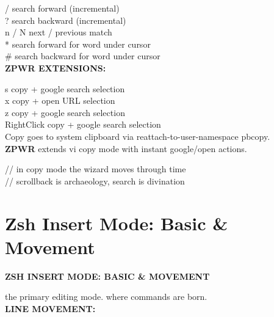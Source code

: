 \documentclass[11pt,a4paper,twoside]{book}
\begin{document}
/                     search forward (incremental)\\
?                     search backward (incremental)\\
n / N                next / previous match\\
*                     search forward for word under cursor\\
\#                     search backward for word under cursor\\


\vspace{12pt}
{\bfseries\color{neonyellow} \textbf{ZPWR} EXTENSIONS:}\vspace{4pt}

s                     copy + google search selection\\
x                     copy + open URL selection\\
z                     copy + google search selection\\
RightClick            copy + google search selection\\

Copy goes to system clipboard via reattach-to-user-namespace pbcopy.\\
\textbf{ZPWR} extends vi copy mode with instant google/open actions.\\

\begin{codebox}
\color{neongreen}// in copy mode the wizard moves through time\\
\color{neongreen}// scrollback is archaeology, search is divination\\
\end{codebox}


\vspace{16pt}

\section{Zsh Insert Mode: Basic \& Movement}


\vspace{10pt}
{\large\bfseries\color{neoncyan} ZSH INSERT MODE: BASIC \& MOVEMENT}\vspace{6pt}

the primary editing mode. where commands are born.\\


\vspace{12pt}
{\bfseries\color{neonyellow} LINE MOVEMENT:}\vspace{4pt}
\end{document}
